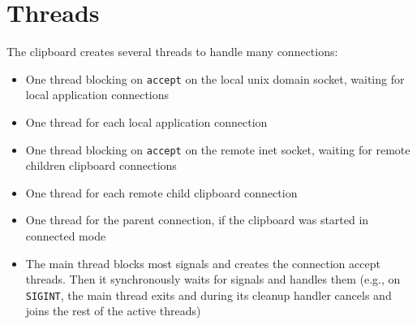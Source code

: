 \documentclass[a4paper, titlepage, english]{article}
\begin{document}
\section{Threads}
\par
The clipboard creates several threads to handle many connections:
\begin{itemize}
	\item One thread blocking on \texttt{accept} on the local unix domain socket, waiting for local application connections
	\item One thread for each local application connection
	\item One thread blocking on \texttt{accept} on the remote inet socket, waiting for remote children clipboard connections
	\item One thread for each remote child clipboard connection
	\item One thread for the parent connection, if the clipboard was started in connected mode
	\item The main thread blocks most signals and creates the connection accept threads. Then it synchronously waits for signals and handles them (e.g., on \texttt{SIGINT}, the main thread exits and during its cleanup handler cancels and joins the rest of the active threads)
\end{itemize}
\end{document}
